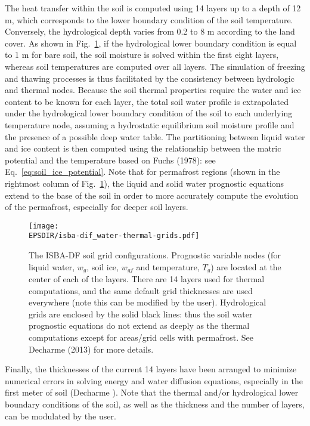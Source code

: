 The heat transfer within the soil is computed using 14
layers up to a depth of 12 m, which corresponds to the lower
boundary condition of the soil temperature. Conversely, the
hydrological depth varies from 0.2 to 8 m according to the
land cover. As shown in Fig.~\ref{fig:isba-dif_soil_grid}, 
if the hydrological
lower boundary condition is equal to 1 m for bare soil,
the soil moisture is solved within the first eight layers,
whereas soil temperatures are computed over all layers. The
simulation of freezing and thawing processes is thus facilitated 
by the consistency between hydrologic and thermal
nodes.
%
Because the soil thermal properties require the water and ice content
to be known for each layer, the total soil water profile is
extrapolated under the hydrological lower boundary condition
of the soil to each underlying temperature node, assuming
a hydrostatic equilibrium soil moisture profile and the presence of a
possible deep water table. The partitioning between liquid
water and ice content is then computed using the relationship
between the matric potential and the temperature based on
Fuchs \etal (1978): see Eq.~\ref{eq:soil_ice_potential}. 
Note that for permafrost regions
(shown in the rightmost column of Fig.~\ref{fig:isba-dif_soil_grid}), the
liquid and solid water prognostic equations extend to the base of the
soil in order to more accurately compute the evolution of the
permafrost, especially for deeper soil layers.

\begin{figure}[!b]
\centerline{ 
\texttt{[image: \\EPSDIR/isba-dif\_water-thermal-grids.pdf]}}
\caption{
The ISBA-DF soil grid configurations. Prognostic variable nodes (for
liquid water, $w_g$, soil ice, $w_{gf}$ and temperature, $T_g$) are located
at the center of each of the layers. There are 14 layers used for
thermal computations, and the same default 
grid thicknesses are used everywhere (note this can be modified by the
user). Hydrological grids are enclosed
by the solid black lines: thus the soil water prognostic equations do
not extend as deeply as the thermal computations except for areas/grid
cells with permafrost. See Decharme \etal (2013) for more details.
}
\label{fig:isba-dif_soil_grid}
\end{figure}

Finally, the thicknesses of the current 14 layers have
been arranged to minimize numerical errors in solving
energy and water diffusion equations, especially in the first
meter of soil (Decharme ). Note that the thermal
and/or hydrological lower boundary conditions of the soil,
as well as the thickness and the number of layers, can be
modulated by the user.

